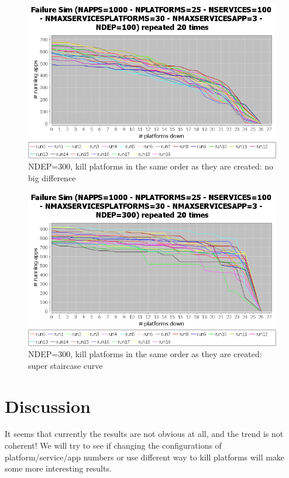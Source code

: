 \documentclass{article}
\begin{document}
\begin{figure}
\includegraphics[width=1.0\textwidth]{dep100-noorder}
\caption{NDEP=300, kill platforms in the same order as they are created: no big difference}
\end{figure}

\begin{figure}
\includegraphics[width=1.0\textwidth]{dep300-noorder}
\caption{NDEP=300, kill platforms in the same order as they are created: super staircase curve}
\end{figure}

\section{Discussion}

It seems that currently the results are not obvious at all, and the trend is not coherent! We will try to see if changing the configurations of platform/service/app numbers or use different way to kill platforms will make some more interesting results.
\end{document}
